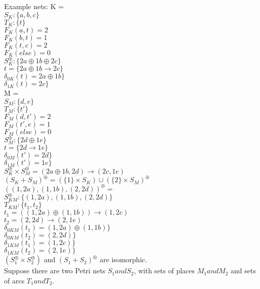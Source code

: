 \newpage
Example nets:
%
K = \\
$S_K :\{ a, b, c\}$\\
$T_K :\{t\}$\\  
$F_K (a, t) = 2$\\
$F_K (b, t) = 1$\\
$F_K (t, c) = 2$\\
$F_K (else) = 0$\\
%
$S_K^\oplus :\{ 2a \oplus 1b \oplus 2c\}$\\
$t = \{ 2a \oplus 1b \rightarrow 2c \}$\\  
$\delta_{0K} (t) = 2a \oplus 1b \}$\\
$\delta_{1K} (t) = 2c \}$\\
\smallskip
M = \\
$S_M :\{d,e\}$\\
$T_M :\{t'\}$\\  
$F_M (d, t') = 2$\\
$F_M (t', e) = 1$\\
$F_M (else) = 0$\\
%
$S_M^\oplus :\{ 2d \oplus 1e\}$\\
$t = \{ 2d \rightarrow 1e \}$\\  
$\delta_{0M} (t') = 2d \}$\\
$\delta_{1M} (t') = 1e \}$\\
\smallskip
$S_K^\oplus \times S_M^\oplus = (2a \oplus 1b, 2d) \rightarrow (2c, 1e)$\\
\smallskip
$(S_K + S_M)^\oplus = (\{1\} \times S_K) \cup (\{2\} \times S_M)^\oplus$\\
$((1, 2a), (1, 1b), (2, 2d))^\oplus = $\\
$S_{KM}^\oplus: \{(1, 2a), (1, 1b), (2, 2d) \}$\\
$T_{KM}: \{t_1, t_2\}$\\
$t_1 = ((1, 2a) \oplus (1, 1b)) \rightarrow (1, 2c)$\\
$t_2 = (2, 2d) \rightarrow (2, 1e)$\\
$\delta_{0KM} (t_1) = (1, 2a) \oplus (1, 1b) \}$\\
$\delta_{0KM} (t_2) = (2, 2d) \}$\\
$\delta_{1KM} (t_1) = (1, 2c) \}$\\
$\delta_{1KM} (t_2) = (2, 1e) \}$\\
\smallskip
$(S_1 ^\oplus \times S_2 ^\oplus)$ and $(S_1 + S_2)^\oplus$ are isomorphic. \\
Suppose there are two Petri nets $S_1 and S_2$, with sets of places $M_1 and M_2$ and sets of arcs $T_1 and T_2.$\\
